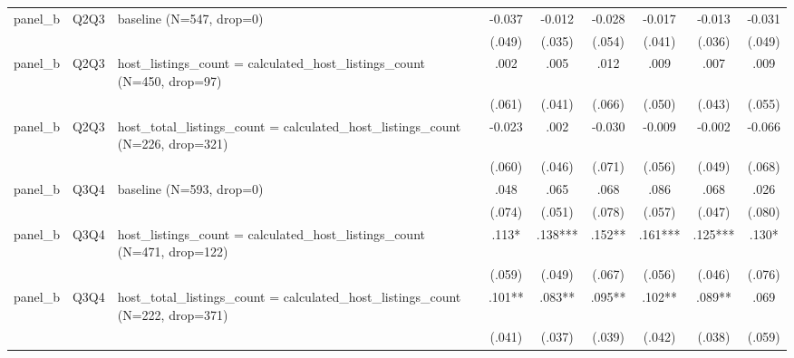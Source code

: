 \begin{tabular}{lllcccccc}
\\
panel\_b & Q2Q3 & baseline (N=547, drop=0) & -0.037 & -0.012 & -0.028 & -0.017 & -0.013 & -0.031
\\
 &  &  & (.049) & (.035) & (.054) & (.041) & (.036) & (.049)
\\
panel\_b & Q2Q3 & host\_listings\_count = calculated\_host\_listings\_count (N=450, drop=97) & .002 & .005 & .012 & .009 & .007 & .009
\\
 &  &  & (.061) & (.041) & (.066) & (.050) & (.043) & (.055)
\\
panel\_b & Q2Q3 & host\_total\_listings\_count = calculated\_host\_listings\_count (N=226, drop=321) & -0.023 & .002 & -0.030 & -0.009 & -0.002 & -0.066
\\
 &  &  & (.060) & (.046) & (.071) & (.056) & (.049) & (.068)
\\
panel\_b & Q3Q4 & baseline (N=593, drop=0) & .048 & .065 & .068 & .086 & .068 & .026
\\
 &  &  & (.074) & (.051) & (.078) & (.057) & (.047) & (.080)
\\
panel\_b & Q3Q4 & host\_listings\_count = calculated\_host\_listings\_count (N=471, drop=122) & .113* & .138*** & .152** & .161*** & .125*** & .130*
\\
 &  &  & (.059) & (.049) & (.067) & (.056) & (.046) & (.076)
\\
panel\_b & Q3Q4 & host\_total\_listings\_count = calculated\_host\_listings\_count (N=222, drop=371) & .101** & .083** & .095** & .102** & .089** & .069
\\
 &  &  & (.041) & (.037) & (.039) & (.042) & (.038) & (.059)
\\
\hline
\end{tabular}
